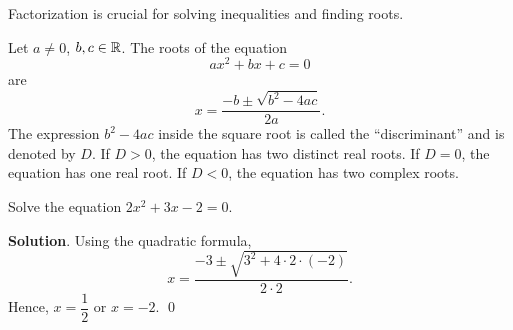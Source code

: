\documentclass[11pt]{book}
\begin{document}
Factorization is crucial for solving inequalities and finding roots.

\begin{theorem}
    Let $a\ne0$, $b, c\in\mathbb{R}$. The roots of the equation $$ax^2+bx+c=0$$ are $$x=\dfrac{-b\pm\sqrt{b^2-4ac}}{2a}.$$ The expression $b^2-4ac$ inside the square root is called the ``discriminant'' and is denoted by $D$. If $D>0$, the equation has two distinct real roots. If $D=0$, the equation has one real root. If $D<0$, the equation has two complex roots.
\end{theorem}

\begin{example}
    Solve the equation $2x^2+3x-2=0.$
\end{example}
\textbf{Solution}. Using the quadratic formula, $$x=\dfrac{-3\pm\sqrt{3^2+4\cdot2\cdot(-2)}}{2\cdot 2}.$$ Hence, $x=\dfrac{1}{2}$ or $x=-2$. \qed
\end{document}
